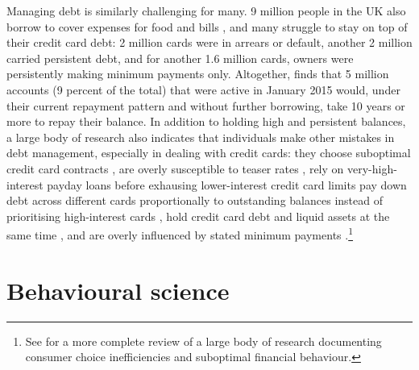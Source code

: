 Managing debt is similarly challenging for many. 9 million people in the UK
also borrow to cover expenses for food and bills \citep{mps2018building}, and
many struggle to stay on top of their credit card debt: 2 million cards were in
arrears or default, another 2 million carried persistent debt, and for another
1.6 million cards, owners were persistently making minimum payments only.
Altogether, \citet{fca2016credit} finds that 5 million accounts (9 percent of the total)
that were active in January 2015 would, under their current repayment pattern
and without further borrowing, take 10 years or more to repay their balance. In addition to holding high and persistent balances, a
large body of research also indicates that individuals make other mistakes in
debt management, especially in dealing with credit cards: they choose
suboptimal credit card contracts \citep{agarwal2015consumers}, are overly susceptible to teaser rates \citep{shui2004time, ausubel1991failure}, rely on very-high-interest payday loans before exhausing lower-interest credit card limits \citep{agarwal2009payday} pay down debt across different cards proportionally to outstanding balances instead of prioritising
high-interest cards \citep{gathergood2019individuals}, hold
credit card debt and liquid assets at the same time \citep{gross2002liquidity,
    gathergood2020co}, and are overly influenced by stated minimum payments \citep{sakaguchi2022default}.\footnote{See \citet{agarwal2017shapes} for a more
    complete review of a large body of research documenting consumer choice
inefficiencies and suboptimal financial behaviour.} 


\section{Behavioural science}

